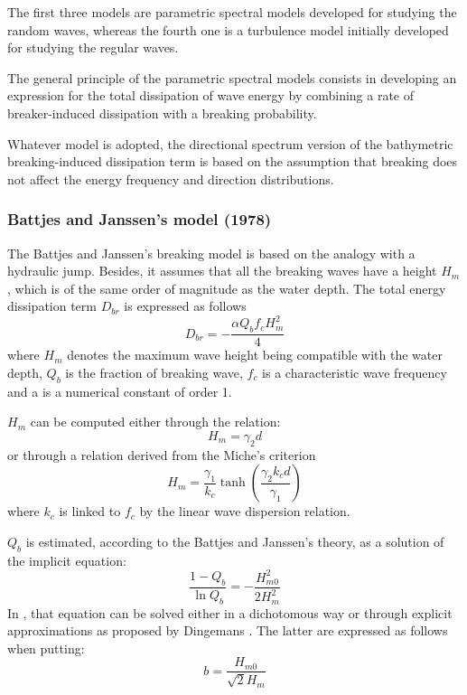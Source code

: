 The first three models are parametric spectral models developed for studying
the random waves, whereas the fourth one is a turbulence model initially
developed for studying the regular waves.

The general principle of the parametric spectral models consists in developing
an expression for the total dissipation of wave energy by combining a rate of
breaker-induced dissipation with a breaking probability.

Whatever model is adopted, the directional spectrum version of the bathymetric
breaking-induced dissipation term is based on the assumption that breaking does
not affect the energy frequency and direction distributions.


\subsubsection{Battjes and Janssen's model (1978)}
\label{parag4.3.5.1}
The Battjes and Janssen's breaking model \cite{Battjes1978} is based on the
analogy with a hydraulic jump. Besides, it assumes that all the breaking waves
have a height $H_m$, which is of the same order of magnitude as the water depth.
The total energy dissipation term $D_{br}$ is expressed as follows
\begin{equation} \label{GrindEQ__4_44_}
D_{br} =-\frac{\alpha Q_b f_c H_m^{2} }{4}
\end{equation}
where $H_m$ denotes the maximum wave height being compatible with the water
depth, $Q_b$ is the fraction of breaking wave, $f_c$ is a characteristic wave
frequency and a is a numerical constant of order 1.

$H_m$ can be computed either through the relation:
\begin{equation} \label{GrindEQ__4_45_}
H_m =\gamma _2 d
\end{equation}
or through a relation derived from the Miche's criterion
\begin{equation} \label{GrindEQ__4_46_}
  H_{m} =\frac{\gamma _1 }{k_c } \tanh \left(\frac{\gamma _2 k_c d}{\gamma _1 }
  \right)
\end{equation}
where $k_c$ is linked to $f_c$ by the linear wave dispersion relation.

$Q_b$ is estimated, according to the Battjes and Janssen's theory, as a
solution of the implicit equation:
\begin{equation} \label{GrindEQ__4_47_}
\frac{1-Q_b }{\ln Q_b } =-\frac{H_{m0}^{2} }{2H_m^{2} }
\end{equation}
In \tomawac, that equation can be solved either in a dichotomous way or
through explicit approximations as proposed by Dingemans \cite{Dingemans1983}.
The latter are expressed as follows when putting:
\[b=\frac{H_{m0} }{\sqrt{2} H_{m} } \]

